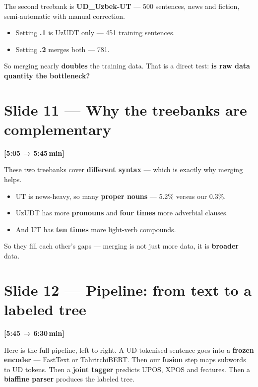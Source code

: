 \documentclass[12pt,a4paper]{article}
\newcommand{\timing}[2]{%
   \par\noindent\textbf{\small [#1\,$\to$\,#2\,min]}\par\vspace{0.2em}}
\newcommand{\say}[1]{\textbf{#1}}
\begin{document}
The second treebank is \textbf{UD\_Uzbek-UT} --- 500 sentences, news and
fiction, semi-automatic with manual correction.

\begin{itemize}
   \item Setting \textbf{.1} is UzUDT only --- 451 training sentences.
   \item Setting \textbf{.2} merges both --- 781.
\end{itemize}

\noindent
So merging nearly \say{doubles} the training data. That is a direct
test: \say{is raw data quantity the bottleneck?}

\section*{Slide 11 --- Why the treebanks are complementary}
\timing{5:05}{5:45}

These two treebanks cover \say{different syntax} --- which is exactly why
merging helps.

\begin{itemize}
   \item UT is news-heavy, so many \textbf{proper nouns} --- 5.2\% versus our 0.3\%.
   \item UzUDT has more \textbf{pronouns} and \textbf{four times} more adverbial clauses.
   \item And UT has \textbf{ten times} more light-verb compounds.
\end{itemize}

\noindent
So they fill each other's gaps --- merging is not just more data, it is
\say{broader} data.

\section*{Slide 12 --- Pipeline: from text to a labeled tree}
\timing{5:45}{6:30}

Here is the full pipeline, left to right. A UD-tokenised sentence goes
into a \say{frozen encoder} --- FastText or TahrirchiBERT. Then our
\textbf{fusion} step maps subwords to UD tokens. Then a \textbf{joint
tagger} predicts UPOS, XPOS and features. Then a \textbf{biaffine parser}
produces the labeled tree.
\end{document}
